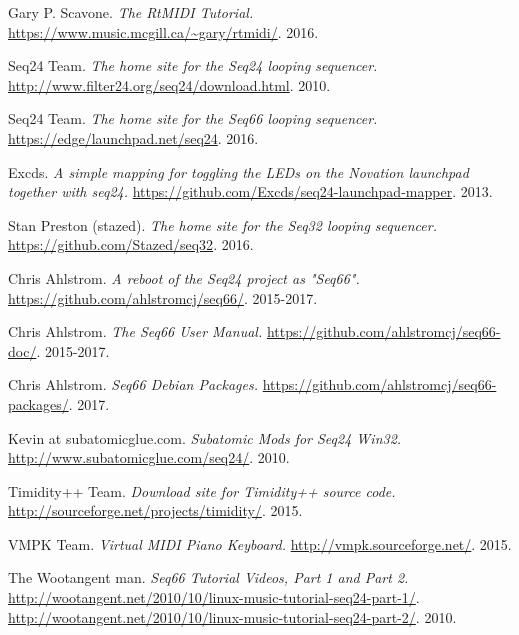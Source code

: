 \begin{thebibliography}{99}
   Gary P. Scavone.
   \emph{The RtMIDI Tutorial.}
   \url{https://www.music.mcgill.ca/~gary/rtmidi/}.
   2016.

   Seq24 Team.
   \emph{The home site for the Seq24 looping sequencer.}
   \url{http://www.filter24.org/seq24/download.html}.
   2010.

   Seq24 Team.
   \emph{The home site for the Seq66 looping sequencer.}
   \url{https://edge/launchpad.net/seq24}.
   2016.

   Excds.
   \emph{A simple mapping for toggling the LEDs on the Novation launchpad
   together with seq24.}
   \url{https://github.com/Excds/seq24-launchpad-mapper}.
   2013.

   Stan Preston (stazed).
   \emph{The home site for the Seq32 looping sequencer.}
   \url{https://github.com/Stazed/seq32}.
   2016.

   Chris Ahlstrom.
   \emph{A reboot of the Seq24 project as "Seq66".}
   \url{https://github.com/ahlstromcj/seq66/}.
   2015-2017.

   Chris Ahlstrom.
   \emph{The Seq66 User Manual.}
   \url{https://github.com/ahlstromcj/seq66-doc/}.
   2015-2017.

   Chris Ahlstrom.
   \emph{Seq66 Debian Packages.}
   \url{https://github.com/ahlstromcj/seq66-packages/}.
   2017.

   Kevin at subatomicglue.com.
   \emph{Subatomic Mods for Seq24 Win32.}
   \url{http://www.subatomicglue.com/seq24/}.
   2010.

   Timidity++ Team.
   \emph{Download site for Timidity++ source code.}
   \url{http://sourceforge.net/projects/timidity/}.
   2015.

   VMPK Team.
   \emph{Virtual MIDI Piano Keyboard.}
   \url{http://vmpk.sourceforge.net/}.
   2015.

   The Wootangent man.
   \emph{Seq66 Tutorial Videos, Part 1 and Part 2.}
   \url{http://wootangent.net/2010/10/linux-music-tutorial-seq24-part-1/}.
   \url{http://wootangent.net/2010/10/linux-music-tutorial-seq24-part-2/}.
   2010.

\end{thebibliography}

